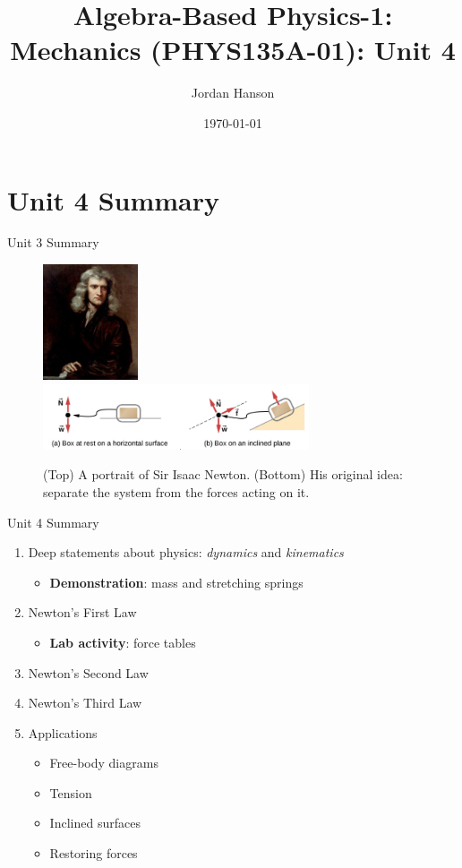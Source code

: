 \documentclass{beamer}
\title{Algebra-Based Physics-1: Mechanics (PHYS135A-01): Unit 4}
\date{\today}
\author{Jordan Hanson}
\institute{Whittier College Department of Physics and Astronomy}
\begin{document}
\maketitle

\section{Unit 4 Summary}

\begin{frame}{Unit 3 Summary}
\begin{figure}
\centering
\includegraphics[width=0.25\textwidth]{figures/newton.png} \\
\includegraphics[width=0.7\textwidth]{figures/forcesA.png}
\caption{\label{fig:newton} (Top) A portrait of Sir Isaac Newton. (Bottom) His original idea: separate the system from the forces acting on it.}
\end{figure}
\end{frame}

\begin{frame}{Unit 4 Summary}
\begin{enumerate}
\item Deep statements about physics: \textit{dynamics} and \textit{kinematics}
\begin{itemize}
\item \textbf{Demonstration}: mass and stretching springs
\end{itemize}
\item Newton's \alert{First Law}
\begin{itemize}
\item \textbf{Lab activity}: force tables
\end{itemize}
\item Newton's \alert{Second Law}
\item Newton's \alert{Third Law}
\item Applications
\begin{itemize}
\item Free-body diagrams
\item Tension
\item Inclined surfaces
\item Restoring forces
\end{itemize}
\end{enumerate}
\end{frame}
\end{document}
